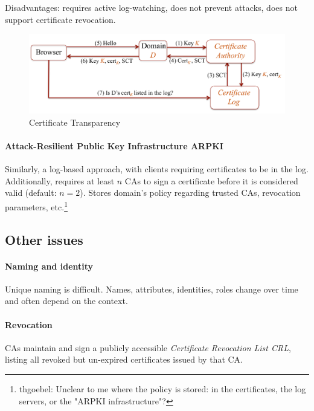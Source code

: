 Disadvantages: requires active log-watching, does not prevent attacks, does not support certificate revocation.

\begin{figure}[h]
    \centering
    \includegraphics[width=12cm]{images/ch10-pki-ct.png}
    \caption{Certificate Transparency}
    \label{fig:pki-ct}
\end{figure}

\paragraph{Attack-Resilient Public Key Infrastructure ARPKI} Similarly, a log-based approach, with clients requiring certificates to be in the log. Additionally, requires at least $n$ CAs to sign a certificate before it is considered valid (default: $n=2$). Stores domain's policy regarding trusted CAs, revocation parameters, etc.\footnote{thgoebel: Unclear to me where the policy is stored: in the certificates, the log servers, or the "ARPKI infrastructure"?}


\subsection{Other issues}

\paragraph{Naming and identity} Unique naming is difficult. Names, attributes, identities, roles change over time and often depend on the context.

\paragraph{Revocation} CAs maintain and sign a publicly accessible \emph{Certificate Revocation List CRL}, listing all revoked but un-expired certificates issued by that CA.

